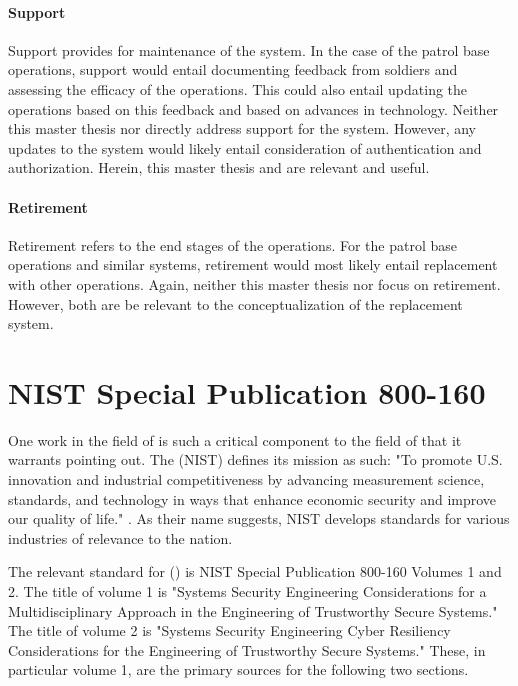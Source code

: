 \documentclass[../../main/main.tex]{subfiles}
\begin{document}
\paragraph*{Support}
Support provides for maintenance of the system.  In the case of the patrol base operations, support would entail documenting feedback from soldiers and assessing the efficacy of the operations.  This could also entail updating the operations based on this feedback and based on advances in technology.  Neither this master thesis nor  directly address support for the system.  However, any updates to the system would likely entail consideration of authentication and authorization. Herein, this master thesis and  are relevant and useful.

\paragraph*{Retirement}
Retirement refers to the end stages of the operations.  For the patrol base operations and similar systems, retirement would most likely entail replacement with other operations.  Again, neither this master thesis nor  focus on retirement.  However, both are be relevant to the conceptualization of the replacement system.

\section{NIST Special Publication 800-160}
One work in the field of  is such a critical component to the field of  that it warrants pointing out. The  (NIST) defines its mission as such: "To promote U.S. innovation and industrial competitiveness by advancing measurement science, standards, and technology in ways that enhance economic security and improve our quality of life." \cite{nistmission}.  As their name suggests, NIST develops standards for various industries of relevance to the nation.   

The relevant standard for  () is NIST Special Publication 800-160 Volumes 1 and 2. The title of volume 1 is "Systems Security Engineering
Considerations for a Multidisciplinary Approach in the Engineering of Trustworthy Secure Systems."  The title of volume 2 is "Systems Security Engineering Cyber Resiliency Considerations for the Engineering of Trustworthy Secure Systems."   These, in particular volume 1, are the primary sources for the following two sections.  
\end{document}
